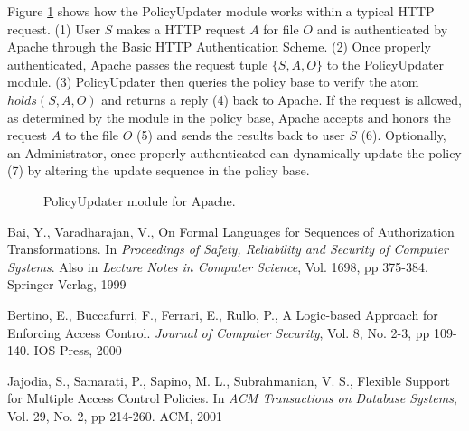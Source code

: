 \documentclass{llncs}
\begin{document}
    Figure \ref{fig-1} shows how the PolicyUpdater module works within a
    typical HTTP request. (1) User $S$ makes a HTTP request $A$ for file
    $O$ and is authenticated by Apache through the Basic HTTP Authentication
    Scheme. (2) Once properly authenticated, Apache passes the request tuple
    $\{S, A, O\}$ to the PolicyUpdater module. (3) PolicyUpdater then queries
    the policy base to verify the atom $holds(S, A, O)$ and returns a reply
    (4) back to Apache. If the request is allowed, as determined by the module
    in the policy base, Apache accepts and honors the request $A$ to the file
    $O$ (5) and sends the results back to user $S$ (6). Optionally, an
    Administrator, once properly authenticated can dynamically update the
    policy (7) by altering the update sequence in the policy base.


  \vspace{-0.5cm}

    \begin{figure}[h]
      \begin{center}
        \caption{PolicyUpdater module for Apache.}
        \label{fig-1}
      \end{center}
    \end{figure}

  \vspace{-1.70cm}

  \begin{thebibliography}{5}
      Bai, Y., Varadharajan, V.,
      On Formal Languages for Sequences of Authorization Transformations.
      In \emph{Proceedings of Safety, Reliability and Security of Computer
      Systems}. Also in \emph{Lecture Notes in Computer Science},
      Vol. 1698, pp 375-384. Springer-Verlag, 1999

      Bertino, E., Buccafurri, F., Ferrari, E., Rullo, P.,
      A Logic-based Approach for Enforcing Access Control.
      \emph{Journal of Computer Security},
      Vol. 8, No. 2-3,
      pp 109-140.
      IOS Press, 2000

      Jajodia, S., Samarati, P., Sapino, M. L., Subrahmanian, V. S.,
      Flexible Support for Multiple Access Control Policies.
      In \emph{ACM Transactions on Database Systems},
      Vol. 29, No. 2,
      pp 214-260.
      ACM, 2001
  \end{thebibliography}
\end{document}
